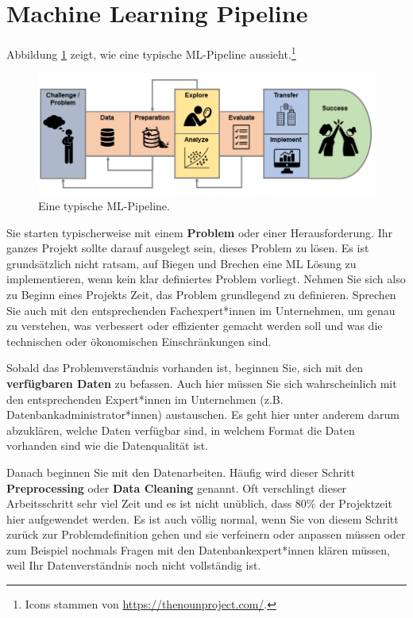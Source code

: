\documentclass[
]{book}
\begin{document}
\hypertarget{machine-learning-pipeline}{%
\section{Machine Learning Pipeline}\label{machine-learning-pipeline}}

Abbildung \ref{fig:pipeline} zeigt, wie eine typische ML-Pipeline aussieht.\footnote{Icons stammen von \url{https://thenounproject.com/}.}

\begin{figure}

{\centering \includegraphics[width=0.9\linewidth]{images/Pipeline} 

}

\caption{Eine typische ML-Pipeline. }\label{fig:pipeline}
\end{figure}

Sie starten typischerweise mit einem \textbf{Problem} oder einer Herausforderung. Ihr ganzes Projekt sollte darauf ausgelegt sein, dieses Problem zu lösen. Es ist grundsätzlich nicht ratsam, auf Biegen und Brechen eine ML Lösung zu implementieren, wenn kein klar definiertes Problem vorliegt. Nehmen Sie sich also zu Beginn eines Projekts Zeit, das Problem grundlegend zu definieren. Sprechen Sie auch mit den entsprechenden Fachexpert*innen im Unternehmen, um genau zu verstehen, was verbessert oder effizienter gemacht werden soll und was die technischen oder ökonomischen Einschränkungen sind.

Sobald das Problemverständnis vorhanden ist, beginnen Sie, sich mit den \textbf{verfügbaren Daten} zu befassen. Auch hier müssen Sie sich wahrscheinlich mit den entsprechenden Expert*innen im Unternehmen (z.B. Datenbankadministrator*innen) austauschen. Es geht hier unter anderem darum abzuklären, welche Daten verfügbar sind, in welchem Format die Daten vorhanden sind wie die Datenqualität ist.

Danach beginnen Sie mit den Datenarbeiten. Häufig wird dieser Schritt \textbf{Preprocessing} oder \textbf{Data Cleaning} genannt. Oft verschlingt dieser Arbeitsschritt sehr viel Zeit und es ist nicht unüblich, dass 80\% der Projektzeit hier aufgewendet werden. Es ist auch völlig normal, wenn Sie von diesem Schritt zurück zur Problemdefinition gehen und sie verfeinern oder anpassen müssen oder zum Beispiel nochmals Fragen mit den Datenbankexpert*innen klären müssen, weil Ihr Datenverständnis noch nicht vollständig ist.
\end{document}
